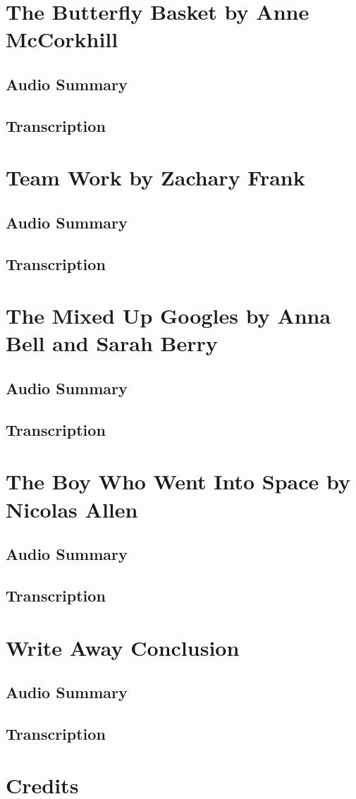 \section{The Butterfly Basket by Anne McCorkhill}

\subsection{Audio Summary}

\subsection{Transcription}

\section{Team Work by Zachary Frank}

\subsection{Audio Summary}

\subsection{Transcription}

\section{The Mixed Up Googles by Anna Bell and Sarah Berry}

\subsection{Audio Summary}

\subsection{Transcription}

\section{The Boy Who Went Into Space by Nicolas Allen}

\subsection{Audio Summary}

\subsection{Transcription}

\section{Write Away Conclusion}

\subsection{Audio Summary}

\subsection{Transcription}

\section{Credits}